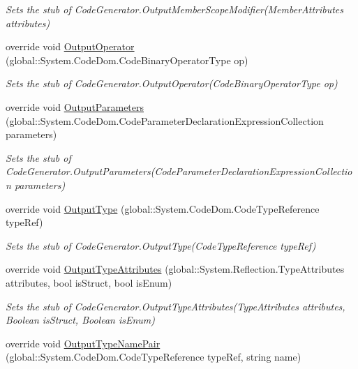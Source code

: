 \begin{DoxyCompactItemize}
\begin{DoxyCompactList}\small\item\em Sets the stub of Code\-Generator.\-Output\-Member\-Scope\-Modifier(\-Member\-Attributes attributes)\end{DoxyCompactList}\item 
override void \hyperlink{class_system_1_1_code_dom_1_1_compiler_1_1_fakes_1_1_stub_code_generator_a01a031e3cc8595a8d583ed83e9153ee5}{Output\-Operator} (global\-::\-System.\-Code\-Dom.\-Code\-Binary\-Operator\-Type op)
\begin{DoxyCompactList}\small\item\em Sets the stub of Code\-Generator.\-Output\-Operator(\-Code\-Binary\-Operator\-Type op)\end{DoxyCompactList}\item 
override void \hyperlink{class_system_1_1_code_dom_1_1_compiler_1_1_fakes_1_1_stub_code_generator_a4ba4a8263e70a206e2f53aa764f03a64}{Output\-Parameters} (global\-::\-System.\-Code\-Dom.\-Code\-Parameter\-Declaration\-Expression\-Collection parameters)
\begin{DoxyCompactList}\small\item\em Sets the stub of Code\-Generator.\-Output\-Parameters(\-Code\-Parameter\-Declaration\-Expression\-Collection parameters)\end{DoxyCompactList}\item 
override void \hyperlink{class_system_1_1_code_dom_1_1_compiler_1_1_fakes_1_1_stub_code_generator_a611d74e749d309ef22874ca062bde3d9}{Output\-Type} (global\-::\-System.\-Code\-Dom.\-Code\-Type\-Reference type\-Ref)
\begin{DoxyCompactList}\small\item\em Sets the stub of Code\-Generator.\-Output\-Type(\-Code\-Type\-Reference type\-Ref)\end{DoxyCompactList}\item 
override void \hyperlink{class_system_1_1_code_dom_1_1_compiler_1_1_fakes_1_1_stub_code_generator_a88d54ea332604f17c288e88615752e5a}{Output\-Type\-Attributes} (global\-::\-System.\-Reflection.\-Type\-Attributes attributes, bool is\-Struct, bool is\-Enum)
\begin{DoxyCompactList}\small\item\em Sets the stub of Code\-Generator.\-Output\-Type\-Attributes(\-Type\-Attributes attributes, Boolean is\-Struct, Boolean is\-Enum)\end{DoxyCompactList}\item 
override void \hyperlink{class_system_1_1_code_dom_1_1_compiler_1_1_fakes_1_1_stub_code_generator_aa2b7e1a6786e7035096ecf67bc50c92d}{Output\-Type\-Name\-Pair} (global\-::\-System.\-Code\-Dom.\-Code\-Type\-Reference type\-Ref, string name)

\end{DoxyCompactItemize}
